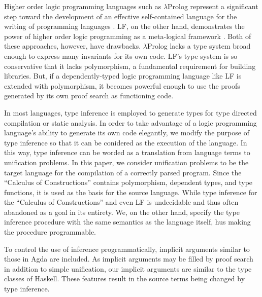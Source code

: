 Higher order logic programming languages such as $\lambda$Prolog represent a significant
step toward the development of an effective self-contained language for the writing 
of programming languages \citep{miller1988overview}. 
LF, on the other hand,
demonstrates the power of higher order logic programming as a meta-logical framework
\citep{pfenning1999system}. Both of these approaches, however, have drawbacks. $\lambda$Prolog lacks a type system broad enough to express many invariants for its own code. LF’s type system
is so conservative that it lacks polymorphism, a fundamental requirement for building
libraries. But, if a dependently-typed logic programming language like LF is extended with polymorphism, it becomes powerful enough to use the proofs generated
by its own proof search as functioning code. 

In most languages, type inference is employed to generate types for type directed compilation or static 
analysis.
In order to take advantage of a logic programming language’s ability to generate its own code elegantly, we modify the purpose of type
inference so that it can be conidered as the execution of the language.
In this way, type inference can be worded as a translation from language terms to unification
problems. In this paper, we consider unification problems to be the target
language for the compilation of a correctly parsed program. Since the ``Calculus of Constructions''
\citep{coquand1986calculus} contains polymorphism, dependent types, and type functions, it is used
as the basis for the source language. While type inference for the ``Calculus of Constructions'' and even LF is undecidable\citep{Dowek93tlca} and thus often abandoned as a goal in its entirety. We, on the other hand, specify the 
type inference procedure with the same semantics as the language itself,
hus making the procedure programmable.

To control the use of inference programmatically, implicit arguments similar to those
in Agda are included. As implicit arguments may be filled by proof search in addition
to simple unification, our implicit arguments are similar to the type classes of Haskell. 
These features result in the source terms being changed by type inference.

